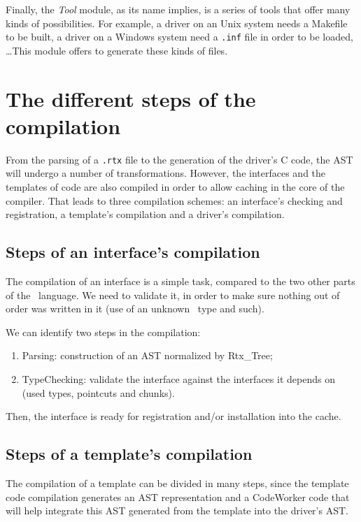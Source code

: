\documentclass[american]{rtxreport}
\begin{document}
Finally, the \emph{Tool} module, as its name implies, is a series of tools that
offer many kinds of possibilities. For example, a driver on an Unix system
needs a Makefile to be built, a driver on a Windows system need a \texttt{.inf}
file in order to be loaded, \ldots This module offers to generate these kinds
of files.


\section{The different steps of the compilation}
\label{sec:compilationSteps}

From the parsing of a \texttt{.rtx} file to the generation of the driver's C
code, the AST will undergo a number of transformations. However, the interfaces
and the templates of code are also compiled in order to allow caching in the
core of the compiler. That leads to three compilation schemes: an interface's
checking and registration, a template's compilation and a driver's compilation.

\subsection{Steps of an interface's compilation}

The compilation of an interface is a simple task, compared to the two other
parts of the \rtx\ language. We need to validate it, in order to make sure
nothing out of order was written in it (use of an unknown \rtx\ type and
such).

We can identify two steps in the compilation:
\begin{enumerate}
    \item Parsing: construction of an AST normalized by Rtx\_Tree;
    \item TypeChecking: validate the interface against the interfaces it
        depends on (used types, pointcuts and chunks).
\end{enumerate}

Then, the interface is ready for registration and/or installation into the
cache.

\subsection{Steps of a template's compilation}

The compilation of a template can be divided in many steps, since the template
code compilation generates an AST representation and a CodeWorker code that
will help integrate this AST generated from the template into the driver's AST.
\end{document}

